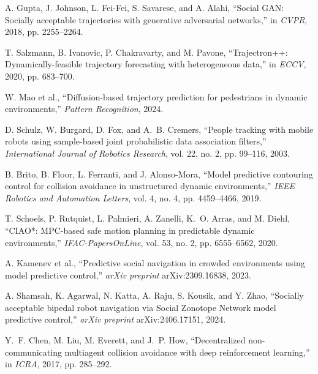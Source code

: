 \documentclass[12pt,a4paper,oneside]{book}
\begin{document}
\begin{enumerate}[label={[\arabic*]}, leftmargin=*]
\item \label{Gupta2018} A. Gupta, J. Johnson, L. Fei-Fei, S. Savarese, and A. Alahi, ``Social GAN: Socially acceptable trajectories with generative adversarial networks,'' in \emph{CVPR}, 2018, pp. 2255--2264.

\item \label{Salzmann2020} T. Salzmann, B. Ivanovic, P. Chakravarty, and M. Pavone, ``Trajectron++: Dynamically-feasible trajectory forecasting with heterogeneous data,'' in \emph{ECCV}, 2020, pp. 683--700.

\item \label{Mao2024} W. Mao et al., ``Diffusion-based trajectory prediction for pedestrians in dynamic environments,'' \emph{Pattern Recognition}, 2024.

\item \label{Schulz2003} D. Schulz, W. Burgard, D. Fox, and A.~B. Cremers, ``People tracking with mobile robots using sample-based joint probabilistic data association filters,'' \emph{International Journal of Robotics Research}, vol. 22, no. 2, pp. 99--116, 2003.

\item \label{Brito2019} B. Brito, B. Floor, L. Ferranti, and J. Alonso-Mora, ``Model predictive contouring control for collision avoidance in unstructured dynamic environments,'' \emph{IEEE Robotics and Automation Letters}, vol. 4, no. 4, pp. 4459--4466, 2019.

\item \label{Schoels2020} T. Schoels, P. Rutquist, L. Palmieri, A. Zanelli, K.~O. Arras, and M. Diehl, ``CIAO*: MPC-based safe motion planning in predictable dynamic environments,'' \emph{IFAC-PapersOnLine}, vol. 53, no. 2, pp. 6555--6562, 2020.

\item \label{Kamenev2023} A. Kamenev et al., ``Predictive social navigation in crowded environments using model predictive control,'' \emph{arXiv preprint} arXiv:2309.16838, 2023.

\item \label{Shamsah2024} A. Shamsah, K. Agarwal, N. Katta, A. Raju, S. Kousik, and Y. Zhao, ``Socially acceptable bipedal robot navigation via Social Zonotope Network model predictive control,'' \emph{arXiv preprint} arXiv:2406.17151, 2024.

\item \label{Chen2017} Y.~F. Chen, M. Liu, M. Everett, and J.~P. How, ``Decentralized non-communicating multiagent collision avoidance with deep reinforcement learning,'' in \emph{ICRA}, 2017, pp. 285--292.


\end{enumerate}
\end{document}
